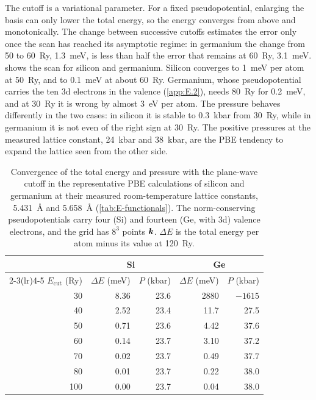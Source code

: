The cutoff is a variational parameter. For a fixed pseudopotential, enlarging the basis can only lower the total energy, so the energy converges from above and monotonically. The change between successive cutoffs estimates the error only once the scan has reached its asymptotic regime: in germanium the change from 50 to \SI{60}{Ry}, \SI{1.3}{meV}, is less than half the error that remains at \SI{60}{Ry}, \SI{3.1}{meV}.  shows the scan for silicon and germanium. Silicon converges to \SI{1}{meV} per atom at \SI{50}{Ry}, and to \SI{0.1}{meV} at about \SI{60}{Ry}. Germanium, whose pseudopotential carries the ten 3d electrons in the valence (\cref{app:E.2}), needs \SI{80}{Ry} for \SI{0.2}{meV}, and at \SI{30}{Ry} it is wrong by almost \SI{3}{eV} per atom. The pressure behaves differently in the two cases: in silicon it is stable to \SI{0.3}{kbar} from \SI{30}{Ry}, while in germanium it is not even of the right sign at \SI{30}{Ry}. The positive pressures at the measured lattice constant, \SI{24}{kbar} and \SI{38}{kbar}, are the PBE tendency to expand the lattice seen from the other side.

\begin{table}[t]
  \centering
  \caption{Convergence of the total energy and pressure with the plane-wave cutoff in the representative PBE calculations of silicon and germanium at their measured room-temperature lattice constants, \SI{5.431}{\angstrom} and \SI{5.658}{\angstrom} (\cref{tab:E-functionals}). The norm-conserving pseudopotentials carry four (Si) and fourteen (Ge, with 3d) valence electrons, and the grid has $8^3$ points $\bm{k}$. $\Delta E$ is the total energy per atom minus its value at \SI{120}{Ry}.}
  \label{tab:E-cutoff}
  \begin{tabular}{r rr rr}
    \toprule
    & \multicolumn{2}{c}{Si} & \multicolumn{2}{c}{Ge} \\
    \cmidrule(lr){2-3}\cmidrule(lr){4-5}
    $E_{\mathrm{cut}}$ (Ry) & $\Delta E$ (meV) & $P$ (kbar) & $\Delta E$ (meV) & $P$ (kbar) \\
    \midrule
    30 & 8.36 & 23.6 & 2880 & $-1615$ \\
    40 & 2.52 & 23.4 & 11.7 & 27.5 \\
    50 & 0.71 & 23.6 & 4.42 & 37.6 \\
    60 & 0.14 & 23.7 & 3.10 & 37.2 \\
    70 & 0.02 & 23.7 & 0.49 & 37.7 \\
    80 & 0.01 & 23.7 & 0.22 & 38.0 \\
    100 & 0.00 & 23.7 & 0.04 & 38.0 \\
    \bottomrule
  \end{tabular}
\end{table}

